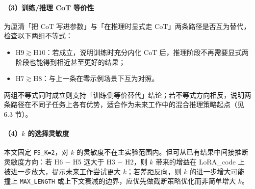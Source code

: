 
\paragraph{（3）训练/推理 CoT 等价性}
为厘清「把 CoT 写进参数」与「在推理时显式走 CoT」两条路径是否互为替代，检查以下两组不等式：
\begin{itemize}
    \item $\mathrm{H9} \gtrsim \mathrm{H10}$：若成立，说明训练时充分内化 CoT 后，推理阶段不再需要显式两阶段也能得到相近甚至更好的结果；
    \item $\mathrm{H7} \gtrsim \mathrm{H8}$：与上一条在零示例场景下互为对照。
\end{itemize}
两组不等式同时成立则支持「训练侧等价替代」结论；若不等式方向相反，说明两条路径在不同子任务上各有优势，适合作为未来工作中的混合推理策略起点（见 6.3 节）。


\paragraph{（4）$k$ 的选择灵敏度}
本文固定 \texttt{FS\_K=2}，对 $k$ 的灵敏度不在主实验范围内。但可从已有结果中间接推断灵敏度方向：若 H6 − H5 远大于 H3 − H2，则 $k$ 带来的增益在 LoRA\_code 上被进一步放大，提示未来工作尝试更大 $k$；若差距反向，则 $k$ 的进一步增大可能撞上 \texttt{MAX\_LENGTH} 或上下文衰减的边界，应优先做截断策略优化而非简单增大 $k$。
